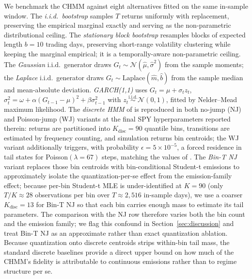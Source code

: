 We benchmark the CHMM against eight alternatives fitted on the same in-sample window.
The \textit{i.i.d.\ bootstrap} samples $T$ returns uniformly with replacement, preserving the empirical marginal exactly and serving as the non-parametric distributional ceiling.
The \textit{stationary block bootstrap} \cite{politis1994stationary} resamples blocks of expected length $b = 10$ trading days, preserving short-range volatility clustering while keeping the marginal empirical; it is a temporally-aware non-parametric ceiling.
The \textit{Gaussian} i.i.d.\ generator draws $G_t \sim \mathcal{N}(\hat\mu, \hat\sigma^2)$ from the sample moments; the \textit{Laplace} i.i.d.\ generator draws $G_t \sim \text{Laplace}(\hat m, \hat b)$ from the sample median and mean-absolute deviation.
\textit{GARCH(1,1)} \cite{bollerslev1986generalized} uses $G_t = \mu + \sigma_t z_t$, $\sigma_t^2 = \omega + \alpha(G_{t-1} - \mu)^2 + \beta \sigma_{t-1}^2$ with $z_t \overset{\text{i.i.d.}}{\sim} \mathcal{N}(0, 1)$, fitted by Nelder--Mead maximum likelihood.
\label{sec:discrete_hmm}%
The \textit{discrete HMM} of \citet{alswaidan2026hybrid} is reproduced in both no-jump (NJ) and Poisson-jump (WJ) variants at the final SPY hyperparameters reported therein: returns are partitioned into $K_{\text{disc}} = 90$ quantile bins, transitions are estimated by frequency counting, and simulation returns bin centroids; the WJ variant additionally triggers, with probability $\epsilon = 5 \times 10^{-5}$, a forced residence in tail states for Poisson$(\lambda = 67)$ steps, matching the values of \citet{alswaidan2026hybrid}.
The \textit{Bin-T NJ} variant replaces those bin centroids with bin-conditional Student-t emissions to approximately isolate the quantization-per-se effect from the emission-family effect; because per-bin Student-t MLE is under-identified at $K = 90$ (only $T/K \approx 28$ observations per bin over $T \approx 2{,}516$ in-sample days), we use a coarser $K_{\text{disc}} = 13$ for Bin-T NJ so that each bin carries enough mass to estimate its tail parameters.
The comparison with the NJ row therefore varies both the bin count and the emission family; we flag this confound in Section~\ref{sec:discussion} and treat Bin-T NJ as an approximate rather than exact quantization ablation.
Because quantization onto discrete centroids strips within-bin tail mass, the standard discrete baselines provide a direct upper bound on how much of the CHMM's fidelity is attributable to continuous emissions rather than to regime structure per se.

